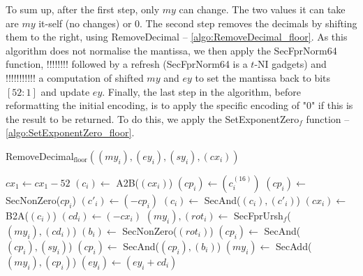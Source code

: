 \documentclass[runningheads]{llncs}
\begin{document}
      To sum up, after the first step, only $my$ can change. The two values it can take are $my$ it-self (no changes) or $0$.
      The second step removes the decimals by shifting them to the right, using RemoveDecimal -- \autoref{algo:RemoveDecimal_floor}. 
      As this algorithm does not normalise the mantissa, we then apply the SecFprNorm64 function, !!!!!!!! followed by a refresh (SecFprNorm64 is a $t$-NI gadgets) and !!!!!!!!!!! a computation of shifted $my$ and $ey$ to set the mantissa back to bits $[52:1]$ and update $ey$.
      Finally, the last step in the algorithm, before reformatting the initial encoding, is to apply the specific encoding of "0" if this is the result to be returned.
      To do this, we apply the SetExponentZero$_f$ function -- \autoref{algo:SetExponentZero_floor}. 
      \begin{algorithm}
          \caption{RemoveDecimal$_{\text{floor}}((my_i), (ey_i), (sy_i), (cx_i))$}
          \label{algo:RemoveDecimal_floor}
          $cx_1 \leftarrow cx_1 - 52$\;%
          $(c_i) \leftarrow$ A2B($(cx_i)$)\;
          $(cp_i) \leftarrow (c_i^{(16)})$\;
          $(cp_i) \leftarrow$ SecNonZero($cp_i$)\;
          $(c'_i) \leftarrow (- cp_i)$\;%
          $(c_i) \leftarrow$ SecAnd($(c_i), (c'_i)$)\;
          $(cx_i) \leftarrow$ B2A($(c_i)$)\;
          $(cd_i) \leftarrow (-cx_i)$\;
          $(my_i), (rot_i) \leftarrow$ SecFprUrsh$_f$($(my_i), (cd_i)$)\;%
          $(b_i) \leftarrow$ SecNonZero($(rot_i)$)\;%
          $(cp_i) \leftarrow$ SecAnd($(cp_i), (sy_i)$)\; 
          $(cp_i) \leftarrow$ SecAnd($(cp_i), (b_i)$)\; 
          $(my_i)\leftarrow$ SecAdd($(my_i), (cp_i)$)\;%
          $(ey_i) \leftarrow (ey_i + cd_i)$\; 
        \;
        \end{algorithm}
\end{document}
